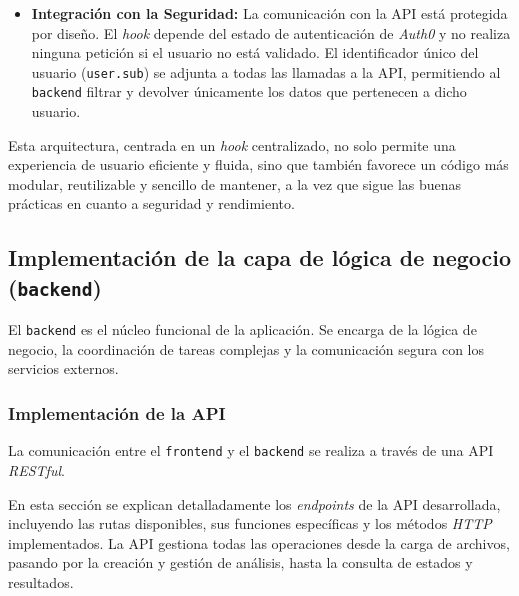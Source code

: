 \begin{itemize}
    \item \textbf{Integración con la Seguridad:} La comunicación con la API está protegida por diseño. El \textit{hook} depende del estado de autenticación de \textit{Auth0} y no realiza ninguna petición si el usuario no está validado. El identificador único del usuario (\texttt{user.sub}) se adjunta a todas las llamadas a la API, permitiendo al \texttt{backend} filtrar y devolver únicamente los datos que pertenecen a dicho usuario.
\end{itemize}

Esta arquitectura, centrada en un \textit{hook} centralizado, no solo permite una experiencia de usuario eficiente y fluida, sino que también favorece un código más modular, reutilizable y sencillo de mantener, a la vez que sigue las buenas prácticas en cuanto a seguridad y rendimiento.


\subsection{Implementación de la capa de lógica de negocio (\texttt{backend})}
\label{subsec:desarrollo_backend}
El \texttt{backend} es el núcleo funcional de la aplicación. Se encarga de la lógica de negocio, la coordinación de tareas complejas y la comunicación segura con los servicios externos.

\subsubsection{Implementación de la API}
La comunicación entre el \texttt{frontend} y el \texttt{backend} se realiza a través de una API \textit{RESTful}.

En esta sección se explican detalladamente los \textit{endpoints} de la API desarrollada, incluyendo las rutas disponibles, sus funciones específicas y los métodos \textit{HTTP} implementados. La API gestiona todas las operaciones desde la carga de archivos, pasando por la creación y gestión de análisis, hasta la consulta de estados y resultados.

